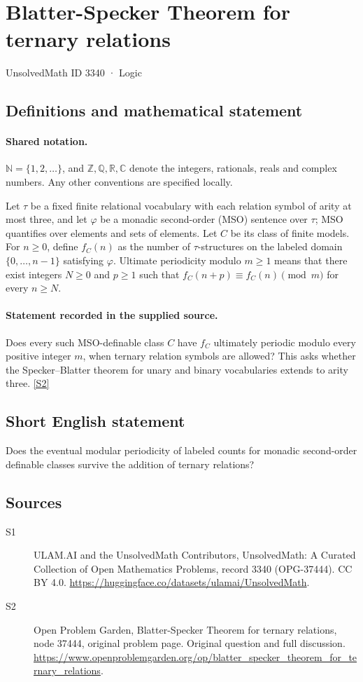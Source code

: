 \documentclass[11pt]{article}
\newcommand{\sref}[2]{\hyperlink{source:#1:#2}{[S#2]}}
\begin{document}
\setcounter{section}{3339}
\section{Blatter-Specker Theorem for ternary relations}\label{3340}
{\small\sffamily UnsolvedMath ID 3340 · Logic}
\subsection{Definitions and mathematical statement}

\paragraph{Shared notation.}$\mathbb N=\{1,2,\ldots\}$, and $\mathbb Z,\mathbb Q,\mathbb R,\mathbb C$ denote the integers, rationals, reals and complex numbers. Any other conventions are specified locally.


Let $\tau$ be a fixed finite relational vocabulary with each relation symbol of arity at most three, and let $\varphi$ be a monadic second-order (MSO) sentence over $\tau$; MSO quantifies over elements and sets of elements. Let $C$ be its class of finite models. For $n\geq0$, define $f_C(n)$ as the number of $\tau$-structures on the labeled domain $\{0,\ldots,n-1\}$ satisfying $\varphi$. Ultimate periodicity modulo $m\geq1$ means that there exist integers $N\geq0$ and $p\geq1$ such that $f_C(n+p)\equiv f_C(n)\pmod m$ for every $n\geq N$.
\paragraph{Statement recorded in the supplied source.}
Does every such MSO-definable class $C$ have $f_C$ ultimately periodic modulo every positive integer $m$, when ternary relation symbols are allowed? This asks whether the Specker--Blatter theorem for unary and binary vocabularies extends to arity three. \sref{3340}{2}
\subsection{Short English statement}
Does the eventual modular periodicity of labeled counts for monadic second-order definable classes survive the addition of ternary relations?
\subsection{Sources}
\begin{description}
\item[\hypertarget{source:3340:1}{S1}] ULAM.AI and the UnsolvedMath Contributors, UnsolvedMath: A Curated Collection of Open Mathematics Problems, record 3340 (OPG-37444). CC BY 4.0. \url{https://huggingface.co/datasets/ulamai/UnsolvedMath}.
\item[\hypertarget{source:3340:2}{S2}] Open Problem Garden, Blatter-Specker Theorem for ternary relations, node 37444, original problem page. Original question and full discussion. \url{https://www.openproblemgarden.org/op/blatter_specker_theorem_for_ternary_relations}.

\end{description}
\label{end:3340}
\end{document}
